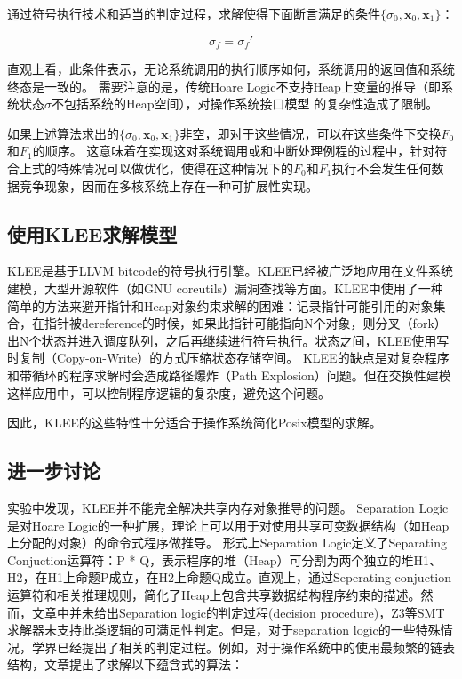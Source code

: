 通过符号执行技术和适当的判定过程，求解使得下面断言满足的条件$\{\sigma_0,\boldsymbol{x}_0,
\boldsymbol{x}_1\}$：

\begin{equation}
\label{eq:hoare4}
\sigma_f = \sigma_f'
\end{equation}

直观上看，此条件表示，无论系统调用的执行顺序如何，系统调用的返回值和系统终态是一致的。
需要注意的是，传统Hoare
Logic不支持Heap上变量的推导（即系统状态$\sigma$不包括系统的Heap空间），对操作系统接口模型
的复杂性造成了限制。

如果上述算法求出的$\{\sigma_0,\boldsymbol{x}_0,
\boldsymbol{x}_1\}$非空，即对于这些情况，可以在这些条件下交换$F_0$和$F_1$的顺序。
这意味着在实现这对系统调用或和中断处理例程的过程中，针对符合上式的特殊情况可以做优化，使得在这种情况下的$F_0$和$F_1$执行不会发生任何数据竞争现象，因而在多核系统上存在一种可扩展性实现。



\subsection{使用KLEE求解模型}
KLEE是基于LLVM
bitcode的符号执行引擎。KLEE已经被广泛地应用在文件系统建模，大型开源软件（如GNU
coreutils）漏洞查找\cite{Cadar:2008:KUA:1855741.1855756}等方面。KLEE中使用了一种简单的方法来避开指针和Heap对象约束求解的困难：记录指针可能引用的对象集合，在指针被dereference的时候，如果此指针可能指向N个对象，则分叉（fork）出N个状态并进入调度队列，之后再继续进行符号执行。状态之间，KLEE使用写时复制（Copy-on-Write）的方式压缩状态存储空间。
KLEE的缺点是对复杂程序和带循环的程序求解时会造成路径爆炸（Path
Explosion）问题。但在交换性建模这样应用中，可以控制程序逻辑的复杂度，避免这个问题。

因此，KLEE的这些特性十分适合于操作系统简化Posix模型的求解。


\subsection{进一步讨论}

实验中发现，KLEE并不能完全解决共享内存对象推导的问题。
Separation Logic是对Hoare
Logic的一种扩展，理论上可以用于对使用共享可变数据结构（如Heap上分配的对象）的命令式程序做推导\cite{Reynolds:2002:SLL:645683.664578}。
形式上Separation Logic定义了Separating Conjuction运算符：P *
Q，表示程序的堆（Heap）可分割为两个独立的堆H1、H2，在H1上命题P成立，在H2上命题Q成立。直观上，通过Seperating
conjuction运算符和相关推理规则，简化了Heap上包含共享数据结构程序约束的描述。然而，文章\cite{Reynolds:2002:SLL:645683.664578}中并未给出Separation
logic的判定过程(decision
procedure)，Z3等SMT求解器未支持此类逻辑的可满足性判定。但是，对于separation
logic的一些特殊情况，学界已经提出了相关的判定过程。例如，对于操作系统中的使用最频繁的链表结构，文章\cite{seplogic:theorem}提出了求解以下蕴含式的算法：

